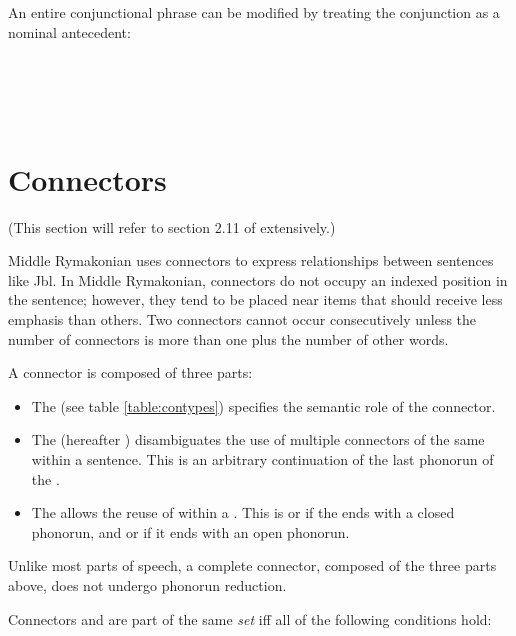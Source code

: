 \documentclass{book}
\newcommand{\lname}{Middle Rymakonian}
\begin{document}
An entire conjunctional phrase can be modified by treating the conjunction as a nominal antecedent: \\
~\\
 \\
 \\
   \\
   

\section{Connectors}

(This section will refer to section 2.11 of  extensively.)

\lname{} uses connectors to express relationships between sentences like Jbl. In \lname{}, connectors do not occupy an indexed position in the sentence; however, they tend to be placed near items that should receive less emphasis than others. Two connectors cannot occur consecutively unless the number of connectors is more than one plus the number of other words.

A connector is composed of three parts:

\begin{itemize}
  \item The  (see table \ref{table:contypes}) specifies the semantic role of the connector.
  \item The  (hereafter ) disambiguates the use of multiple connectors of the same  within a sentence. This is an arbitrary continuation of the last phonorun of the .
  \item The  allows the reuse of  within a . This is  or  if the  ends with a closed phonorun, and  or  if it ends with an open phonorun.
\end{itemize}

Unlike most parts of speech, a complete connector, composed of the three parts above, does not undergo phonorun reduction.

Connectors  and  are part of the same \emph{set}  iff all of the following conditions hold:
\end{document}
